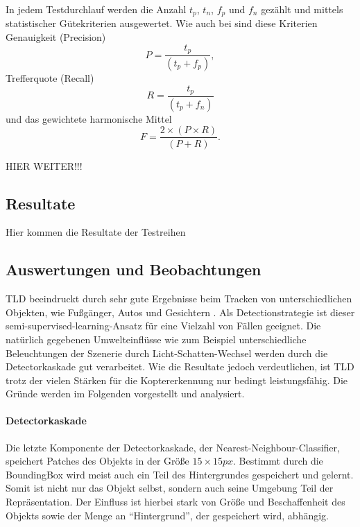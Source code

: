 	In jedem Testdurchlauf werden die Anzahl $t_p$, $t_n$, $f_p$ und $f_n$ gezählt und mittels statistischer Gütekriterien ausgewertet. 
  Wie auch bei \cite{TLD} sind diese Kriterien Genauigkeit (Precision) \begin{equation} P=\frac{t_p}{(t_p + f_p)},\end{equation}
  Trefferquote (Recall) \begin{equation} R=\frac{t_p}{(t_p + f_n)} \end{equation}
  und das gewichtete harmonische Mittel \begin{equation} F=\frac{2 \times (P \times R)}{(P + R)}.\end{equation}

  HIER WEITER!!!

\subsection{Resultate}
	Hier kommen die Resultate der Testreihen 

\subsection{Auswertungen und Beobachtungen} 
	\label{subsec:conclusion}
	TLD beeindruckt durch sehr gute Ergebnisse beim Tracken von unterschiedlichen Objekten, wie Fußgänger, Autos und Gesichtern \cite{TLD}. Als Detectionstrategie ist dieser semi-supervised-learning-Ansatz für eine Vielzahl von Fällen geeignet. Die natürlich gegebenen Umwelteinflüsse wie zum Beispiel unterschiedliche Beleuchtungen der Szenerie durch Licht-Schatten-Wechsel werden durch die Detectorkaskade gut verarbeitet. Wie die Resultate jedoch verdeutlichen, ist TLD trotz der vielen Stärken für die Koptererkennung nur bedingt leistungsfähig. Die Gründe werden im Folgenden vorgestellt und analysiert.

	\paragraph{Detectorkaskade}
	Die letzte Komponente der Detectorkaskade, der Nearest-Neighbour-Classifier, speichert Patches des Objekts in der Größe $15\times15 px$. Bestimmt durch die BoundingBox wird meist auch ein Teil des Hintergrundes gespeichert und gelernt. Somit ist nicht nur das Objekt selbst, sondern auch seine Umgebung Teil der Repräsentation. Der Einfluss ist hierbei stark von Größe und Beschaffenheit des Objekts sowie der Menge an ``Hintergrund'', der gespeichert wird, abhängig.

